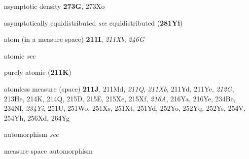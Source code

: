 asymptotic density {\bf 273G}, 273Xo








asymptotically equidistributed {\it see} equidistributed
({\bf 281Yi})






atom (in a measure space) {\bf 211I}, {\it 211Xb},
{\it 246G}




{atomic {\it see}}

purely atomic ({\bf 211K})






atomless measure (space) {\bf 211J},  211Md, {\it 211Q},
{\it 211Xb}, 211Yd,
211Ye, {\it 212G}, 213He, 214K, 214Q, 215D, 215E, 215Xe, 215Xf,
{\it 216A}, 216Ya, 216Ye, 234Be, 234Nf, {\it 234Yi},
251U, 251Wo, 251Xs, 251Xt, 251Yd,
252Yo, 252Yq, 252Ys, 254V, 254Yh, 256Xd, 264Yg






















automorphism {\it see}









measure space automorphism









